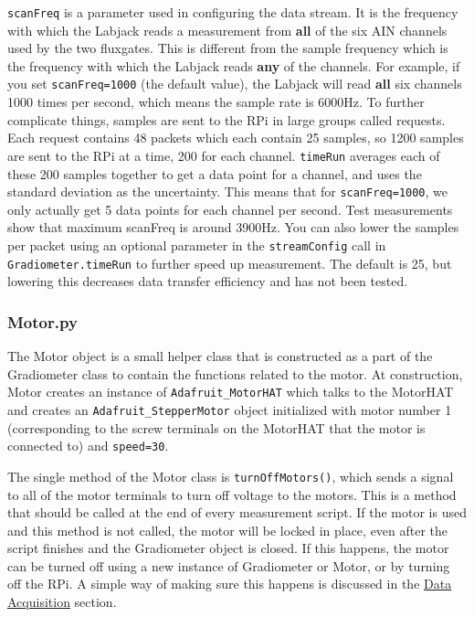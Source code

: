 \documentclass{TheMartianReport}
\newcommand{\pyinline}[1]{\texttt{#1}}
\begin{document}
\pyinline{scanFreq} is a parameter used in configuring the data stream. It is the frequency with which the Labjack reads a measurement from \textbf{all} of the six AIN channels used by the two fluxgates. This is different from the sample frequency which is the frequency with which the Labjack reads \textbf{any} of the channels. For example, if you set \pyinline{scanFreq=1000} (the default value), the Labjack will read \textbf{all} six channels 1000 times per second, which means the sample rate is 6000Hz. To further complicate things, samples are sent to the RPi in large groups called requests. Each request contains 48 packets which each contain 25 samples, so 1200 samples are sent to the RPi at a time, 200 for each channel. \pyinline{timeRun} averages each of these 200 samples together to get a data point for a channel, and uses the standard deviation as the uncertainty. This means that for \pyinline{scanFreq=1000}, we only actually get 5 data points for each channel per second. Test measurements show that maximum scanFreq is around 3900Hz. You can also lower the samples per packet using an optional parameter in the \pyinline{streamConfig} call in \pyinline{Gradiometer.timeRun} to further speed up measurement. The default is 25, but lowering this decreases data transfer efficiency and has not been tested.

\subsubsection{Motor.py}
The Motor object is a small helper class that is constructed as a part of the Gradiometer class to contain the functions related to the motor. At construction, Motor creates an instance of \pyinline{Adafruit_MotorHAT} which talks to the MotorHAT and creates an \pyinline{Adafruit_StepperMotor} object initialized with motor number 1 (corresponding to the screw terminals on the MotorHAT that the motor is connected to) and \pyinline{speed=30}.

The single method of the Motor class is \pyinline{turnOffMotors()}, which sends a signal to all of the motor terminals to turn off voltage to the motors. This is a method that should be called at the end of every measurement script. If the motor is used and this method is not called, the motor will be locked in place, even after the script finishes and the Gradiometer object is closed. If this happens, the motor can be turned off using a new instance of Gradiometer or Motor, or by turning off the RPi. A simple way of making sure this happens is discussed in the \hyperref[subsec:Acquisition]{Data Acquisition} section.
\end{document}
